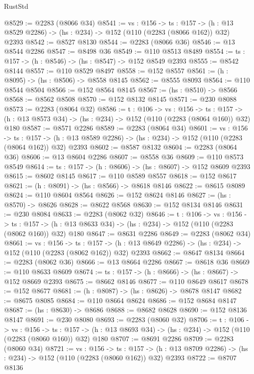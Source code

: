 \begin{lexlean}{RustStd}
\begin{coremodule}
@8529 := @2283 (@8066 @34)
@8541 := {vs : @156} ->
  {ts : @157} -> (h : @13 @8529 @2286) -> (hs : @234) -> @152 (@110 (@2283 (@8066 @162)) @32) @2393
@8542 := @8527 @8130
@8544 := @2283 (@8066 @36)
@8546 := @13 @8544 @2286
@8547 := @8498 @36
@8549 := @110 @8513 @8489
@8554 := {ts : @157} -> (h : @8546) -> (hs : @8547) -> @152 @8549 @2393
@8555 := @8542 @8144
@8557 := @110 @8529 @8497
@8558 := @152 @8557
@8561 := (h : @8095) -> (hs : @8506) -> @8558 @8145
@8562 := @8555 @8093
@8564 := @110 @8544 @8504
@8566 := @152 @8564 @8145
@8567 := (hs : @8510) -> @8566
@8568 := @8562 @8508
@8570 := @152 @8132 @8145
@8571 := @230 @8088
@8573 := @2283 (@8064 @32)
@8586 := {t : @106} ->
  {vs : @156} ->
  {ts : @157} -> (h : @13 @8573 @34) -> (hs : @234) -> @152 (@110 (@2283 (@8064 @160)) @32) @180
@8587 := @8571 @2286
@8589 := @2283 (@8064 @34)
@8601 := {vs : @156} ->
  {ts : @157} -> (h : @13 @8589 @2286) -> (hs : @234) -> @152 (@110 (@2283 (@8064 @162)) @32) @2393
@8602 := @8587 @8132
@8604 := @2283 (@8064 @36)
@8606 := @13 @8604 @2286
@8607 := @8558 @36
@8609 := @110 @8573 @8549
@8614 := {ts : @157} -> (h : @8606) -> (hs : @8607) -> @152 @8609 @2393
@8615 := @8602 @8145
@8617 := @110 @8589 @8557
@8618 := @152 @8617
@8621 := (h : @8091) -> (hs : @8566) -> @8618 @8146
@8622 := @8615 @8089
@8624 := @110 @8604 @8564
@8626 := @152 @8624 @8146
@8627 := (hs : @8570) -> @8626
@8628 := @8622 @8568
@8630 := @152 @8134 @8146
@8631 := @230 @8084
@8633 := @2283 (@8062 @32)
@8646 := {t : @106} ->
  {vs : @156} ->
  {ts : @157} -> (h : @13 @8633 @34) -> (hs : @234) -> @152 (@110 (@2283 (@8062 @160)) @32) @180
@8647 := @8631 @2286
@8649 := @2283 (@8062 @34)
@8661 := {vs : @156} ->
  {ts : @157} -> (h : @13 @8649 @2286) -> (hs : @234) -> @152 (@110 (@2283 (@8062 @162)) @32) @2393
@8662 := @8647 @8134
@8664 := @2283 (@8062 @36)
@8666 := @13 @8664 @2286
@8667 := @8618 @36
@8669 := @110 @8633 @8609
@8674 := {ts : @157} -> (h : @8666) -> (hs : @8667) -> @152 @8669 @2393
@8675 := @8662 @8146
@8677 := @110 @8649 @8617
@8678 := @152 @8677
@8681 := (h : @8087) -> (hs : @8626) -> @8678 @8147
@8682 := @8675 @8085
@8684 := @110 @8664 @8624
@8686 := @152 @8684 @8147
@8687 := (hs : @8630) -> @8686
@8688 := @8682 @8628
@8690 := @152 @8136 @8147
@8691 := @230 @8080
@8693 := @2283 (@8060 @32)
@8706 := {t : @106} ->
  {vs : @156} ->
  {ts : @157} -> (h : @13 @8693 @34) -> (hs : @234) -> @152 (@110 (@2283 (@8060 @160)) @32) @180
@8707 := @8691 @2286
@8709 := @2283 (@8060 @34)
@8721 := {vs : @156} ->
  {ts : @157} -> (h : @13 @8709 @2286) -> (hs : @234) -> @152 (@110 (@2283 (@8060 @162)) @32) @2393
@8722 := @8707 @8136

\end{coremodule}
\end{lexlean}
